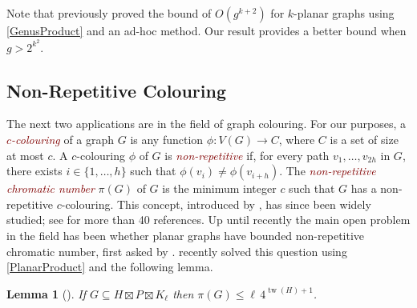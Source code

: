 \documentclass{patmorin}
\theoremstyle{plain}
\newtheorem{lem}[thm]{Lemma}
\newtheorem{cor}[thm]{Corollary}
\theoremstyle{definition}
\newcommand{\defin}[1]{\textcolor{Maroon}{\emph{#1}}}
\newcommand{\note}[2]{\noindent{\color{red}[#1:~#2]}}
\DeclareMathOperator{\tw}{tw}
\renewcommand{\le}{\leqslant}
\begin{document}
Note that \citet{DJMMUW20} previously proved the bound of
$O(g^{k+2})$ for $k$-planar graphs using \cref{GenusProduct} and an ad-hoc method. Our result provides a better bound when $g>2^{k^2}$.

\subsection{Non-Repetitive Colouring}

The next two applications are in the field of graph colouring. For our purposes, a \defin{$c$-colouring} of a graph $G$ is any function $\phi\colon V(G)\to C$, where $C$ is a set of size at most $c$.
A $c$-colouring $\phi$ of $G$ is \defin{non-repetitive} if, for every path $v_1,\ldots,v_{2h}$ in $G$, there exists $i\in\{1,\ldots,h\}$ such that $\phi(v_i)\neq\phi(v_{i+h})$.  The \defin{non-repetitive chromatic number} $\pi(G)$ of $G$ is the minimum integer $c$ such that $G$ has a non-repetitive $c$-colouring. This concept, introduced by \citet{AGHR-RSA02}, has since been widely studied; see \citep{dujmovic.esperet.ea:planar} for more than 40 references. Up until recently the main open problem in the field has been whether planar graphs have bounded non-repetitive chromatic number, first asked by \citet{AGHR-RSA02}. \citet{dujmovic.esperet.ea:planar} recently solved this question using \cref{PlanarProduct} and the following lemma.

\begin{lem}[\citep{dujmovic.esperet.ea:planar}]
\label{non-repetitive}
If $G\subseteq H\boxtimes P \boxtimes K_\ell$ then $\pi(G)\le \ell\, 4^{\tw(H)+1}$.
\end{lem}

%
\end{document}
